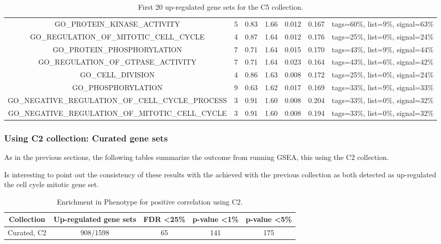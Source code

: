 \begin{table}[h!]
{\begin{tabular}{ccccccc}
    GO\_PROTEIN\_KINASE\_ACTIVITY                                & 5    & 0.83 & 1.66 & 0.012     & 0.167     & tags=60\%, list=9\%, signal=63\%  \\
    GO\_REGULATION\_OF\_MITOTIC\_CELL\_CYCLE                     & 4    & 0.87 & 1.64 & 0.012     & 0.176     & tags=25\%, list=0\%, signal=24\%  \\
    GO\_PROTEIN\_PHOSPHORYLATION                                 & 7    & 0.71 & 1.64 & 0.015     & 0.170     & tags=43\%, list=9\%, signal=44\%  \\
    GO\_REGULATION\_OF\_GTPASE\_ACTIVITY                         & 7    & 0.71 & 1.64 & 0.023     & 0.164     & tags=43\%, list=6\%, signal=42\%  \\
    GO\_CELL\_DIVISION                                           & 4    & 0.86 & 1.63 & 0.008     & 0.172     & tags=25\%, list=0\%, signal=24\%  \\
    GO\_PHOSPHORYLATION                                          & 9    & 0.63 & 1.62 & 0.017     & 0.169     & tags=33\%, list=9\%, signal=33\%  \\
    GO\_NEGATIVE\_REGULATION\_OF\_CELL\_CYCLE\_PROCESS           & 3    & 0.91 & 1.60 & 0.008     & 0.204     & tags=33\%, list=0\%, signal=32\%  \\
    GO\_NEGATIVE\_REGULATION\_OF\_MITOTIC\_CELL\_CYCLE           & 3    & 0.91 & 1.60 & 0.008     & 0.194     & tags=33\%, list=0\%, signal=32\%  \\ \hline
    \end{tabular}%
    }
    \caption{First 20 up-regulated gene sets for the C5 collection.}
    \label{detailed_pos_c5}
    \end{table}

\newpage
\subsubsection{Using C2 collection: Curated gene sets}

As in the previous sections, the following tables summarize the outcome from running GSEA, this using the C2 collection.

Is interesting to point out the consistency of these results with the achieved with the previous collection as both detected as up-regulated the cell cycle mitotic gene set.

\begin{table}[h!]
    \centering
    \begin{tabular}{ccccc}
    \hline
    Collection      & Up-regulated gene sets & FDR \textless 25\% & p-value \textless 1\% & p-value \textless 5\% \\ \hline
    Curated, C2     & 908/1598               & 65                                & 141                                  & 175                                  \\ \hline
    \end{tabular}
    \caption{Enrichment in Phenotype for positive correlation using C2.}
    \label{enr_ph_positive_c2}
    \end{table}

